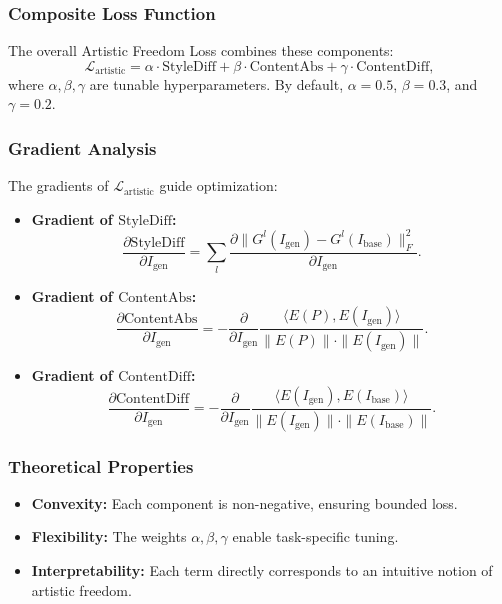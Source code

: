 \subsubsection{Composite Loss Function}
The overall Artistic Freedom Loss combines these components:
\[
\mathcal{L}_{\text{artistic}} = \alpha \cdot \text{StyleDiff} + \beta \cdot \text{ContentAbs} + \gamma \cdot \text{ContentDiff},
\]
where \(\alpha, \beta, \gamma\) are tunable hyperparameters. By default, \(\alpha = 0.5\), \(\beta = 0.3\), and \(\gamma = 0.2\).

\subsubsection{Gradient Analysis}
The gradients of \(\mathcal{L}_{\text{artistic}}\) guide optimization:
\begin{itemize}
    \item \textbf{Gradient of \(\text{StyleDiff}\):}
    \[
    \frac{\partial \text{StyleDiff}}{\partial I_{\text{gen}}} = \sum_{l} \frac{\partial \| G^l(I_{\text{gen}}) - G^l(I_{\text{base}}) \|_F^2}{\partial I_{\text{gen}}}.
    \]
    \item \textbf{Gradient of \(\text{ContentAbs}\):}
    \[
    \frac{\partial \text{ContentAbs}}{\partial I_{\text{gen}}} = - \frac{\partial}{\partial I_{\text{gen}}} \frac{\langle E(P), E(I_{\text{gen}}) \rangle}{\|E(P)\| \cdot \|E(I_{\text{gen}})\|}.
    \]
    \item \textbf{Gradient of \(\text{ContentDiff}\):}
    \[
    \frac{\partial \text{ContentDiff}}{\partial I_{\text{gen}}} = - \frac{\partial}{\partial I_{\text{gen}}} \frac{\langle E(I_{\text{gen}}), E(I_{\text{base}}) \rangle}{\|E(I_{\text{gen}})\| \cdot \|E(I_{\text{base}})\|}.
    \]
\end{itemize}

\subsubsection{Theoretical Properties}
\begin{itemize}
    \item \textbf{Convexity:} Each component is non-negative, ensuring bounded loss.
    \item \textbf{Flexibility:} The weights \(\alpha, \beta, \gamma\) enable task-specific tuning.
    \item \textbf{Interpretability:} Each term directly corresponds to an intuitive notion of artistic freedom.
\end{itemize}

